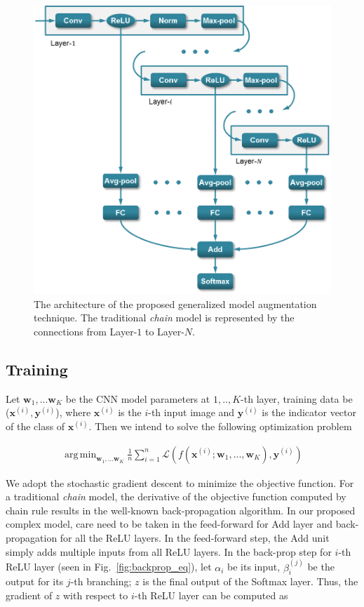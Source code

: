 \documentclass[10pt,twocolumn,letterpaper]{article}
\DeclareMathOperator*{\argmin}{arg\,min}
\begin{document}
\begin{figure}[htbp]
\centering
	\includegraphics[width=\columnwidth]{fig/fig_model.png}
\caption{The architecture of the proposed generalized model augmentation technique. The traditional \textit{chain} model is represented by the connections from Layer-$1$ to Layer-$N$.}

\label{fig:model}
\end{figure}

\subsection{Training}

Let $\textbf{w}_1,...\textbf{w}_K$ be the CNN model parameters at $1,..,K$-th layer, training data be ($\textbf{x}^{(i)},\textbf{y}^{(i)}$), where $\textbf{x}^{(i)}$ is the $i$-th input image and $\textbf{y}^{(i)}$ is the indicator vector of the class of $\textbf{x}^{(i)}$. Then we intend to solve the following optimization problem

\begin{align}
\argmin_{\textbf{w}_1,...\textbf{w}_K} \frac{1}{n}\sum_{i=1}^{n} \mathcal{L}(f(\textbf{x}^{(i)};\textbf{w}_1,...,\textbf{w}_K),\textbf{y}^{(i)})
\end{align}

We adopt the stochastic gradient descent to minimize the objective function. For a traditional \textit{chain} model, the derivative of the objective function computed by chain rule results in the well-known back-propagation algorithm. In our proposed complex model, care need to be taken in the feed-forward for Add layer and back-propagation for all the ReLU layers. In the feed-forward step, the Add unit simply adds multiple inputs from all ReLU layers. In the back-prop step for $i$-th ReLU layer (seen in Fig.~\ref{fig:backprop_eq}), let $\alpha_i$ be its input, $\beta_i^{(j)}$ be the output for its $j$-th branching; $z$ is the final output of the Softmax layer. Thus, the gradient of $z$ with respect to $i$-th ReLU layer can be computed as
\end{document}

